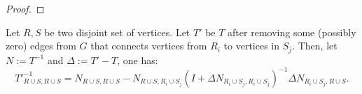 \begin{proof}
\end{proof}

\begin{theorem}[Update 2]
\label{update:2}
    Let \(R, S\) be two disjoint set of vertices. Let \(T'\) be \(T\) after removing some (possibly zero) edges from \(G\) that connects vertices from \(R_i\) to vertices in \(S_j\).
    Then, let \(N := T^{-1}\) and \(\Delta := T' - T\), one has:
    \[
        {T'}^{-1}_{R \cup S, R \cup S} = N_{R \cup S, R \cup S} - N_{R \cup S, R_i \cup S_j}(I + \Delta N_{R_i \cup S_j, R_i \cup S_j})^{-1} \Delta N_{R_i \cup S_j, R \cup S}.
    \]
\end{theorem}

